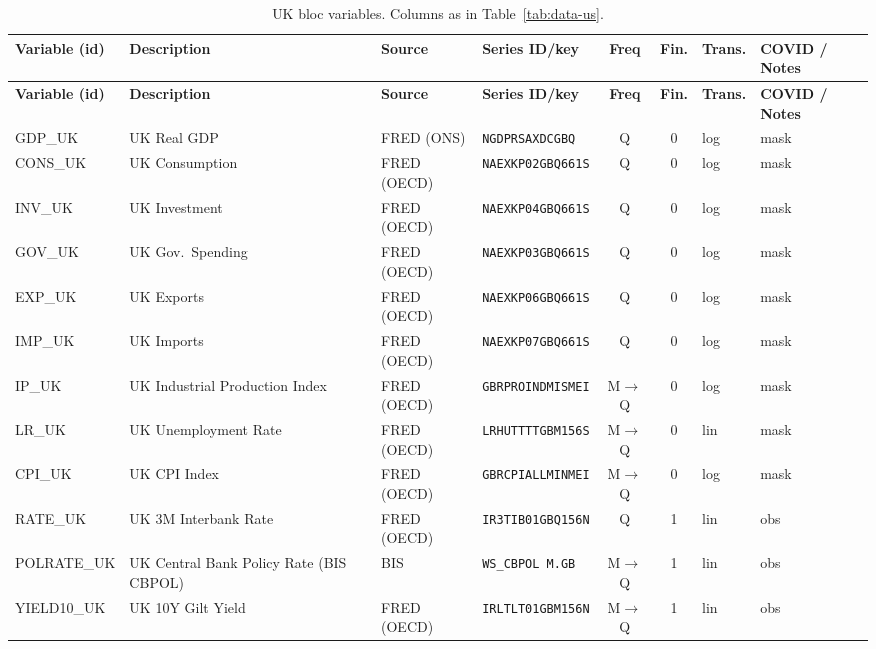 {\footnotesize\setlength{\tabcolsep}{3.5pt}
\begin{longtable}{@{}>{\raggedright\arraybackslash}p{1.7cm} >{\raggedright\arraybackslash}p{2.7cm} >{\raggedright\arraybackslash}p{1.35cm} >{\raggedright\arraybackslash}p{2.55cm} c c >{\raggedright\arraybackslash}p{0.85cm} >{\raggedright\arraybackslash}p{2.75cm}@{}}
\caption{UK bloc variables. Columns as in
Table~\ref{tab:data-us}.}\label{tab:data-uk}\\
\toprule
\textbf{Variable (id)} & \textbf{Description} & \textbf{Source} & \textbf{Series ID/key} & \textbf{Freq} & \textbf{Fin.} & \textbf{Trans.} & \textbf{COVID / Notes} \\
\midrule
\endfirsthead
\toprule
\textbf{Variable (id)} & \textbf{Description} & \textbf{Source} & \textbf{Series ID/key} & \textbf{Freq} & \textbf{Fin.} & \textbf{Trans.} & \textbf{COVID / Notes} \\
\midrule
\endhead
\bottomrule
\endfoot
GDP\_UK     & UK Real GDP & FRED (ONS) & \texttt{NGDPRSAXDCGBQ} & Q & 0 & log & mask \\
CONS\_UK    & UK Consumption & FRED (OECD) & \texttt{NAEXKP02GBQ661S} & Q & 0 & log & mask \\
INV\_UK     & UK Investment & FRED (OECD) & \texttt{NAEXKP04GBQ661S} & Q & 0 & log & mask \\
GOV\_UK     & UK Gov.\ Spending & FRED (OECD) & \texttt{NAEXKP03GBQ661S} & Q & 0 & log & mask \\
EXP\_UK     & UK Exports & FRED (OECD) & \texttt{NAEXKP06GBQ661S} & Q & 0 & log & mask \\
IMP\_UK     & UK Imports & FRED (OECD) & \texttt{NAEXKP07GBQ661S} & Q & 0 & log & mask \\
IP\_UK      & UK Industrial Production Index & FRED (OECD) & \texttt{GBRPROINDMISMEI} & M$\to$Q & 0 & log & mask \\
LR\_UK      & UK Unemployment Rate & FRED (OECD) & \texttt{LRHUTTTTGBM156S} & M$\to$Q & 0 & lin & mask \\
CPI\_UK     & UK CPI Index & FRED (OECD) & \texttt{GBRCPIALLMINMEI} & M$\to$Q & 0 & log & mask \\
RATE\_UK    & UK 3M Interbank Rate & FRED (OECD) & \texttt{IR3TIB01GBQ156N} & Q & 1 & lin & obs \\
POLRATE\_UK & UK Central Bank Policy Rate (BIS CBPOL) & BIS & \texttt{WS\_CBPOL M.GB} & M$\to$Q & 1 & lin & obs \\
YIELD10\_UK & UK 10Y Gilt Yield & FRED (OECD) & \texttt{IRLTLT01GBM156N} & M$\to$Q & 1 & lin & obs \\

\end{longtable}}
